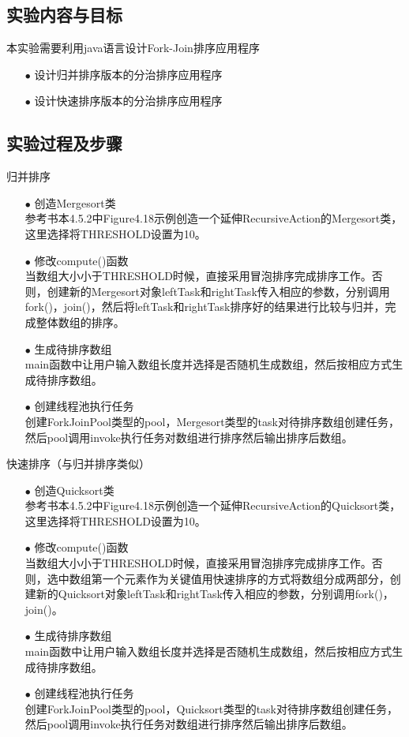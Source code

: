 \documentclass{article}
\begin{document}
\subsection{实验内容与目标}
本实验需要利用java语言设计Fork-Join排序应用程序
\begin{itemize}
\item[$\bullet$]设计归并排序版本的分治排序应用程序
\item[$\bullet$]设计快速排序版本的分治排序应用程序
\end{itemize}
\subsection{实验过程及步骤}
\noindent
归并排序
\begin{itemize}
\item[$\bullet$]创造Mergesort类\\
参考书本4.5.2中Figure4.18示例创造一个延伸RecursiveAction的Mergesort类，这里选择将THRESHOLD设置为10。
\item[$\bullet$]修改compute()函数\\
当数组大小小于THRESHOLD时候，直接采用冒泡排序完成排序工作。否则，创建新的Mergesort对象leftTask和rightTask传入相应的参数，分别调用fork()，join()，然后将leftTask和rightTask排序好的结果进行比较与归并，完成整体数组的排序。
\item[$\bullet$]生成待排序数组\\
main函数中让用户输入数组长度并选择是否随机生成数组，然后按相应方式生成待排序数组。
\item[$\bullet$]创建线程池执行任务\\
创建ForkJoinPool类型的pool，Mergesort类型的task对待排序数组创建任务，然后pool调用invoke执行任务对数组进行排序然后输出排序后数组。
\end{itemize}
快速排序（与归并排序类似）
\begin{itemize}
\item[$\bullet$]创造Quicksort类\\
参考书本4.5.2中Figure4.18示例创造一个延伸RecursiveAction的Quicksort类，这里选择将THRESHOLD设置为10。
\item[$\bullet$]修改compute()函数\\
当数组大小小于THRESHOLD时候，直接采用冒泡排序完成排序工作。否则，选中数组第一个元素作为关键值用快速排序的方式将数组分成两部分，创建新的Quicksort对象leftTask和rightTask传入相应的参数，分别调用fork()，join()。
\item[$\bullet$]生成待排序数组\\
main函数中让用户输入数组长度并选择是否随机生成数组，然后按相应方式生成待排序数组。
\item[$\bullet$]创建线程池执行任务\\
创建ForkJoinPool类型的pool，Quicksort类型的task对待排序数组创建任务，然后pool调用invoke执行任务对数组进行排序然后输出排序后数组。
\end{itemize}
\end{document}
